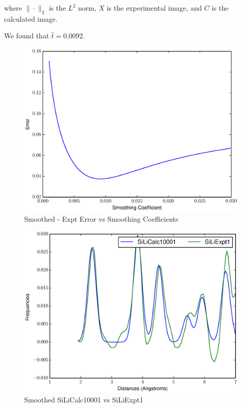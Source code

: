 \documentclass[12pt,letterpaper]{article}
\begin{document}
where $\|\cdot\|_2$ is the $L^2$ norm, $X$ is the experimental image, and $C$ is
the calculated image.

We found that $\hat{t} = 0.0092$.

\begin{figure}[ht]
  \begin{center}
    \includegraphics[scale=0.8]{figs/SmoothingCalibrationCurve.eps}
    \caption{Smoothed - Expt Error vs Smoothing Coefficients}
  \end{center}
\end{figure}

\begin{figure}[ht]
  \begin{center}
    \includegraphics[scale=0.8]{figs/SmoothCalibrationSiLiCalc10001-SiLiExpt1.eps}
    \caption{Smoothed SiLiCalc10001 vs SiLiExpt1}
  \end{center}
\end{figure}
\end{document}

